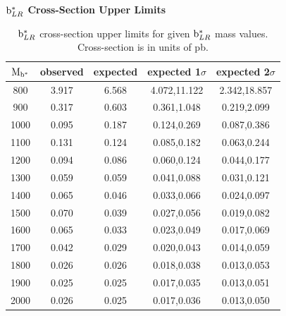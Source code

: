 \begin{table}
\begin{center}
\bf{$\mathrm{b}^{*}_{LR}$ Cross-Section Upper Limits}\\
\begin{tabular}{c||c|c|c|c}
\hline\hline
\bf{$\mathrm{M_{\mathrm{b}^{*}}}$} & \bf{observed}  & \bf{expected} & \bf{expected 1$\sigma$}  & \bf{expected 2$\sigma$} \\
\hline
\hline
800 & 3.917 & 6.568 & 4.072,11.122 & 2.342,18.857\\ 
900 & 0.317 & 0.603 & 0.361,1.048 & 0.219,2.099\\ 
1000 & 0.095 & 0.187 & 0.124,0.269 & 0.087,0.386\\ 
1100 & 0.131 & 0.124 & 0.085,0.182 & 0.063,0.244\\ 
1200 & 0.094 & 0.086 & 0.060,0.124 & 0.044,0.177\\ 
1300 & 0.059 & 0.059 & 0.041,0.088 & 0.031,0.121\\ 
1400 & 0.065 & 0.046 & 0.033,0.066 & 0.024,0.097\\ 
1500 & 0.070 & 0.039 & 0.027,0.056 & 0.019,0.082\\ 
1600 & 0.065 & 0.033 & 0.023,0.049 & 0.017,0.069\\ 
1700 & 0.042 & 0.029 & 0.020,0.043 & 0.014,0.059\\ 
1800 & 0.026 & 0.026 & 0.018,0.038 & 0.013,0.053\\ 
1900 & 0.025 & 0.025 & 0.017,0.035 & 0.013,0.051\\ 
2000 & 0.026 & 0.025 & 0.017,0.036 & 0.013,0.050\\ 
\hline
\end{tabular}
\end{center}
\caption{$\mathrm{b}^{*}_{LR}$ cross-section upper limits for given $\mathrm{b}^{*}_{LR}$ mass values.  Cross-section is in units of pb.}
\label{table:bsupperxsecLR}
\end{table}



